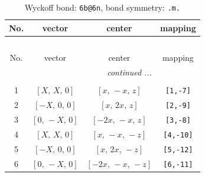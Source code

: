 \documentclass[fleqn,8pt]{jsarticle}
\begin{document}
\begin{longtable}{cccc}
\caption{Wyckoff bond: {\tt 6b@6n}, bond symmetry: {\tt .m.}}
 \\
 \hline \hline
No. & vector & center & mapping \\ \hline \endfirsthead

\multicolumn{3}{l}{\tablename\ \thetable{}} \\
 \hline \hline
No. & vector & center & mapping \\ \hline \endhead

 \hline \hline
\multicolumn{3}{r}{\footnotesize\it continued ...} \\ \endfoot

 \hline \hline
\multicolumn{3}{r}{} \\ \endlastfoot

1 & $\left[ X,\, X,\, 0 \right]$ & $\left[ x,\, - x,\, z \right]$ & {\tt [1,-7]} \\ \hline
2 & $\left[ - X,\, 0,\, 0 \right]$ & $\left[ x,\, 2 x,\, z \right]$ & {\tt [2,-9]} \\ \hline
3 & $\left[ 0,\, - X,\, 0 \right]$ & $\left[ - 2 x,\, - x,\, z \right]$ & {\tt [3,-8]} \\ \hline
4 & $\left[ X,\, X,\, 0 \right]$ & $\left[ x,\, - x,\, - z \right]$ & {\tt [4,-10]} \\ \hline
5 & $\left[ - X,\, 0,\, 0 \right]$ & $\left[ x,\, 2 x,\, - z \right]$ & {\tt [5,-12]} \\ \hline
6 & $\left[ 0,\, - X,\, 0 \right]$ & $\left[ - 2 x,\, - x,\, - z \right]$ & {\tt [6,-11]} \\
\end{longtable}
\renewcommand{\arraystretch}{1.2}
\end{document}
